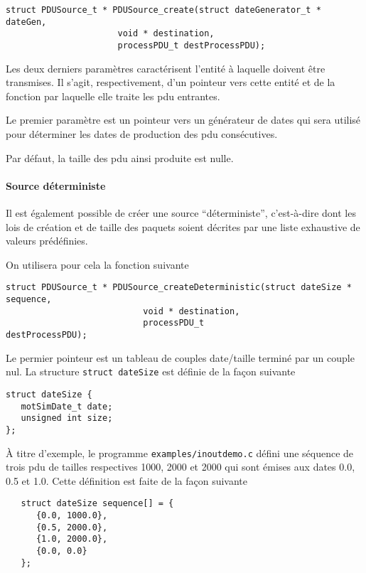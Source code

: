 \begin{verbatim}
struct PDUSource_t * PDUSource_create(struct dateGenerator_t * dateGen,
				      void * destination,
				      processPDU_t destProcessPDU);
\end{verbatim}

   Les deux derniers paramètres caractérisent l'entité à laquelle
doivent être transmises. Il s'agit, respectivement, d'un pointeur vers
cette entité et  de la fonction par laquelle elle traite les {\sc pdu}
entrantes.

   Le premier paramètre est un pointeur vers un générateur de dates
qui sera utilisé pour déterminer les dates  de production des {\sc
  pdu} consécutives.

   Par défaut, la taille des {\sc pdu} ainsi produite est nulle.

%
%
%
\paragraph{Source déterministe}

   Il est également possible de créer une source ``déterministe'',
c'est-à-dire dont les lois de création et de taille des paquets soient
décrites par une liste exhaustive de valeurs prédéfinies.

   On utilisera pour cela la fonction suivante

\begin{verbatim}
struct PDUSource_t * PDUSource_createDeterministic(struct dateSize * sequence,
						   void * destination,
						   processPDU_t
destProcessPDU);
\end{verbatim}

   Le permier pointeur est un tableau de couples date/taille terminé
par un couple nul. La structure \lstinline!struct dateSize! est
définie de la façon suivante 

\begin{verbatim}
struct dateSize {
   motSimDate_t date;
   unsigned int size;
};
\end{verbatim}

   À titre d'exemple, le programme {\tt examples/inoutdemo.c} défini
une séquence de trois {\sc pdu} de tailles respectives 1000, 2000 et
2000 qui sont émises aux dates 0.0, 0.5 et 1.0. Cette définition est
faite de la façon suivante

\begin{verbatim}
   struct dateSize sequence[] = {
      {0.0, 1000.0},
      {0.5, 2000.0},
      {1.0, 2000.0},
      {0.0, 0.0}
   };
\end{verbatim}

